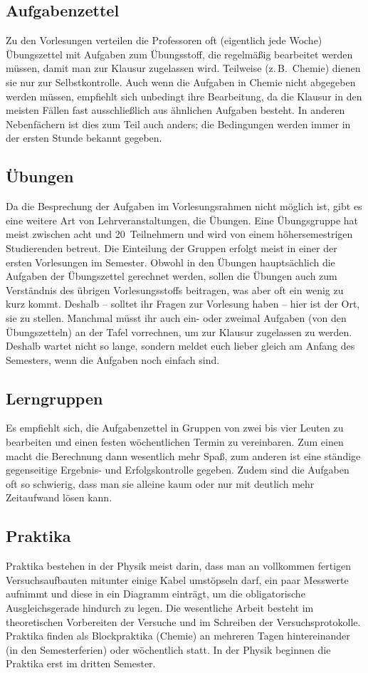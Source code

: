 \begin{multicols}{2}
\subsection{Aufgabenzettel}
Zu den Vorlesungen verteilen die Professoren oft (eigentlich jede Woche) Übungszettel mit Aufgaben zum Übungsstoff, die regelmäßig bearbeitet werden müssen, damit man zur Klausur zugelassen wird.
Teilweise (z.\,B.\ Chemie) dienen sie nur zur Selbstkontrolle.
Auch wenn die Aufgaben in Chemie nicht abgegeben werden müssen, empfiehlt sich unbedingt ihre Bearbeitung, da die Klausur in den meisten Fällen fast ausschließlich aus ähnlichen Aufgaben besteht.
In anderen Nebenfächern ist dies zum Teil auch anders; die Bedingungen werden immer in der ersten Stunde bekannt gegeben.

\subsection{Übungen}
Da die Besprechung der Aufgaben im Vorlesungsrahmen nicht möglich ist, gibt es eine weitere Art von Lehrveranstaltungen, die Übungen.
Eine Übungsgruppe hat meist zwischen acht und 20~Teilnehmern und wird von einem höhersemestrigen Studierenden betreut.
Die Einteilung der Gruppen erfolgt meist in einer der ersten Vorlesungen im Semester.
Obwohl in den Übungen hauptsächlich die Aufgaben der Übungszettel gerechnet werden, sollen die Übungen auch zum Verständnis des übrigen Vorlesungsstoffs beitragen, was aber oft ein wenig zu kurz kommt.
Deshalb -- solltet ihr Fragen zur Vorlesung haben -- hier ist der Ort, sie zu stellen.
Manchmal müsst ihr auch ein- oder zweimal Aufgaben (von den Übungszetteln) an der Tafel vorrechnen, um zur Klausur zugelassen zu werden.
Deshalb wartet nicht so lange, sondern meldet euch lieber gleich am Anfang des Semesters, wenn die Aufgaben noch einfach sind.

\subsection{Lerngruppen}
Es empfiehlt sich, die Aufgabenzettel in Gruppen von zwei bis vier Leuten zu bearbeiten und einen festen wöchentlichen Termin zu vereinbaren.
Zum einen macht die Berechnung dann wesentlich mehr Spaß, zum anderen ist eine ständige gegenseitige Ergebnis- und Erfolgskontrolle gegeben.
Zudem sind die Aufgaben oft so schwierig, dass man sie alleine kaum oder nur mit deutlich mehr Zeitaufwand lösen kann.

\subsection{Praktika}
Praktika bestehen in der Physik meist darin, dass man an vollkommen fertigen Versuchsaufbauten mitunter einige Kabel umstöpseln darf, ein paar Messwerte aufnimmt und diese in ein Diagramm einträgt, um die obligatorische Ausgleichsgerade hindurch zu legen.
Die wesentliche Arbeit besteht im theoretischen Vorbereiten der Versuche und im Schreiben der Versuchsprotokolle.
Praktika finden als Blockpraktika (Chemie) an mehreren Tagen hintereinander (in den Semesterferien) oder wöchentlich statt.
In der Physik beginnen die Praktika erst im dritten Semester.


\end{multicols}
